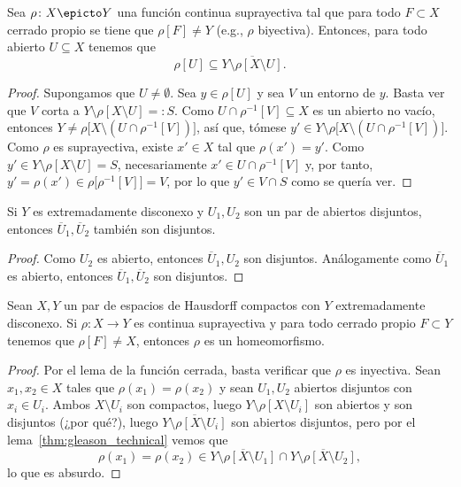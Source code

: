 \documentclass[topologia-analisis.tex]{subfiles}
\begin{document}
\begin{lem}\label{thm:gleason_technical}
	Sea $\rho \colon X \epicto Y$ una función continua suprayectiva tal que para todo $F \subset X$ cerrado propio se tiene que $\rho[F] \ne Y$
	(e.g., $\rho$ biyectiva).
	Entonces, para todo abierto $U \subseteq X$ tenemos que
	$$ \rho[U] \subseteq \overline{Y \setminus \rho[X \setminus U]}. $$
\end{lem}
\begin{proof}
	Supongamos que $U \ne \emptyset$.
	Sea $y \in \rho[U]$ y sea $V$ un entorno de $y$. Basta ver que $V$ corta a $Y \setminus \rho[X \setminus U] =: S$.
	Como $U \cap \rho^{-1}[V] \subseteq X$ es un abierto no vacío, entonces $Y \ne \rho\big[ X \setminus (U \cap \rho^{-1}[V]) \big]$, así que,
	tómese $y' \in Y \setminus \rho\big[ X \setminus (U \cap \rho^{-1}[V]) \big]$.
	Como $\rho$ es suprayectiva, existe $x' \in X$ tal que $\rho(x') = y'$.
	Como $y' \in Y \setminus \rho[X \setminus U] = S$, necesariamente $x' \in U \cap \rho^{-1}[V]$ y,
	por tanto, $y' = \rho(x') \in \rho\big[ \rho^{-1}[V] \big] = V$, por lo que $y' \in V \cap S$ como se quería ver.
\end{proof}

\begin{lem}
	Si $Y$ es extremadamente disconexo y $U_1, U_2$ son un par de abiertos disjuntos, entonces $\overline{U}_1, \overline{U}_2$ también son disjuntos.
\end{lem}
\begin{proof}
	Como $U_2$ es abierto, entonces $\overline{U}_1, U_2$ son disjuntos.
	Análogamente como $\overline{U}_1$ es abierto, entonces $\overline{U}_1, \overline{U}_2$ son disjuntos.
\end{proof}

\begin{lem}
	Sean $X, Y$ un par de espacios de Hausdorff compactos con $Y$ extremadamente disconexo.
	Si $\rho \colon X \to Y$ es continua suprayectiva y para todo cerrado propio $F \subset Y$ tenemos que $\rho[F] \ne X$,
	entonces $\rho$ es un homeomorfismo.
\end{lem}
\begin{proof}
	Por el lema de la función cerrada, basta verificar que $\rho$ es inyectiva.
	Sean $x_1, x_2 \in X$ tales que $\rho(x_1) = \rho(x_2)$ y sean $U_1, U_2$ abiertos disjuntos con $x_i \in U_i$.
	Ambos $X \setminus U_i$ son compactos, luego $Y \setminus \rho[X \setminus U_i]$ son abiertos y son disjuntos (¿por qué?),
	luego $\overline{Y \setminus \rho[X \setminus U_i]}$ son abiertos disjuntos, pero por el lema~\ref{thm:gleason_technical} vemos que
	\[
		\rho(x_1) = \rho(x_2) \in \overline{Y \setminus \rho[X \setminus U_1]} \cap \overline{Y \setminus \rho[X \setminus U_2]},
	\]
	lo que es absurdo.
\end{proof}
\end{document}
